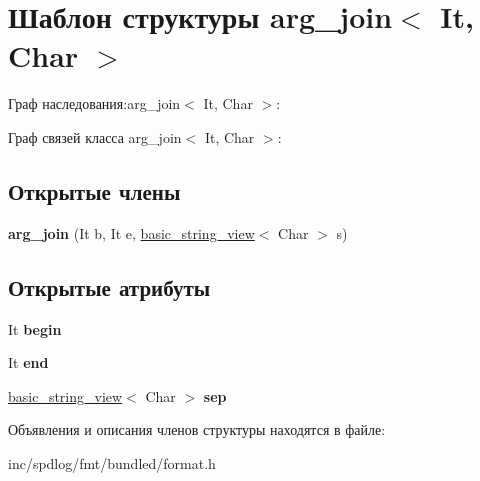 \hypertarget{structarg__join}{}\section{Шаблон структуры arg\+\_\+join$<$ It, Char $>$}
\label{structarg__join}


Граф наследования\+:arg\+\_\+join$<$ It, Char $>$\+:


Граф связей класса arg\+\_\+join$<$ It, Char $>$\+:
\subsection*{Открытые члены}
\begin{DoxyCompactItemize}
\item 
\mbox{\label{structarg__join_a513f25d89355641e27ee6801038d75f0}} 
{\bfseries arg\+\_\+join} (It b, It e, \hyperlink{classbasic__string__view}{basic\+\_\+string\+\_\+view}$<$ Char $>$ s)
\end{DoxyCompactItemize}
\subsection*{Открытые атрибуты}
\begin{DoxyCompactItemize}
\item 
\mbox{\label{structarg__join_ac8f29af772de01a375a649dbb41ea3cc}} 
It {\bfseries begin}
\item 
\mbox{\label{structarg__join_a01b412e9e99d7fad229fcd9a7a4bede7}} 
It {\bfseries end}
\item 
\mbox{\label{structarg__join_a67aae7f3c5d2573a5fb85de3c5fd9b3d}} 
\hyperlink{classbasic__string__view}{basic\+\_\+string\+\_\+view}$<$ Char $>$ {\bfseries sep}
\end{DoxyCompactItemize}


Объявления и описания членов структуры находятся в файле\+:\begin{DoxyCompactItemize}
\item 
inc/spdlog/fmt/bundled/format.\+h\end{DoxyCompactItemize}
